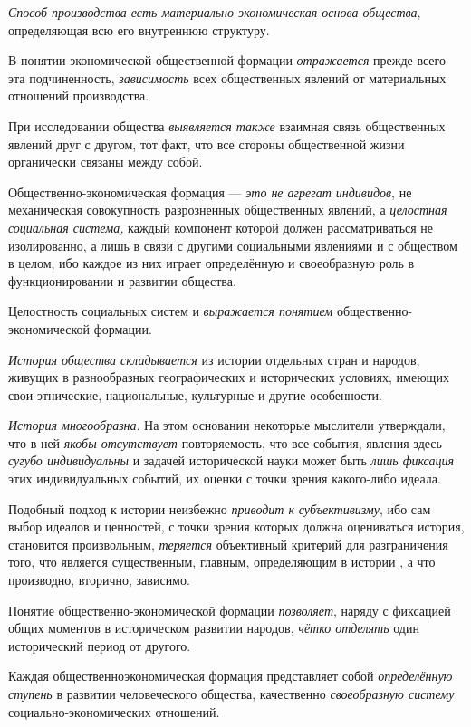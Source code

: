 \documentclass[a4paper,14pt,russian]{extreport}
\begin{document}
\emph{Способ производства есть материально-экономическая основа общества}, определяющая всю его внутреннюю структуру.

В понятии экономической общественной формации \emph{отражается} прежде всего эта подчиненность, \emph{зависимость} всех общественных явлений от материальных отношений производства.

При исследовании общества \emph{выявляется также} взаимная связь общественных явлений друг с другом, тот факт, что все стороны общественной жизни органически связаны между собой.

Общественно-экономическая формация --- \emph{это не агрегат индивидов}, не механическая совокупность разрозненных общественных явлений, а \emph{целостная социальная система,} каждый компонент которой должен рассматриваться не изолированно, а лишь в связи с другими социальными явлениями и с обществом в целом, ибо каждое из них играет определённую и своеобразную роль в функционировании и развитии общества.

Целостность социальных систем и \emph{выражается понятием} общественно-экономической формации.

\emph{История общества складывается} из истории отдельных стран и народов, живущих в разнообразных географических и исторических условиях, имеющих свои этнические, национальные, культурные и другие особенности.

\emph{История многообразна}. На этом основании некоторые мыслители утверждали, что в ней \emph{якобы отсутствует} повторяемость, что все события, явления здесь \emph{сугубо индивидуальны} и задачей исторической науки может быть \emph{лишь фиксация} этих индивидуальных событий, их оценки с точки зрения какого-либо идеала.

Подобный подход к истории неизбежно \emph{приводит к} \emph{субъективизму}, ибо сам выбор идеалов и ценностей, с точки зрения которых должна оцениваться история, становится произвольным, \emph{теряется} объективный критерий для разграничения того, что является существенным, главным, определяющим в истории , а что производно, вторично, зависимо.

Понятие общественно-экономической формации \emph{позволяет}, наряду с фиксацией общих моментов в историческом развитии народов, \emph{чётко отделять} один исторический период от другого.

Каждая общественноэкономическая формация представляет собой \emph{определённую ступень} в развитии человеческого общества, качественно \emph{своеобразную систему} социально-экономических отношений.
\end{document}
